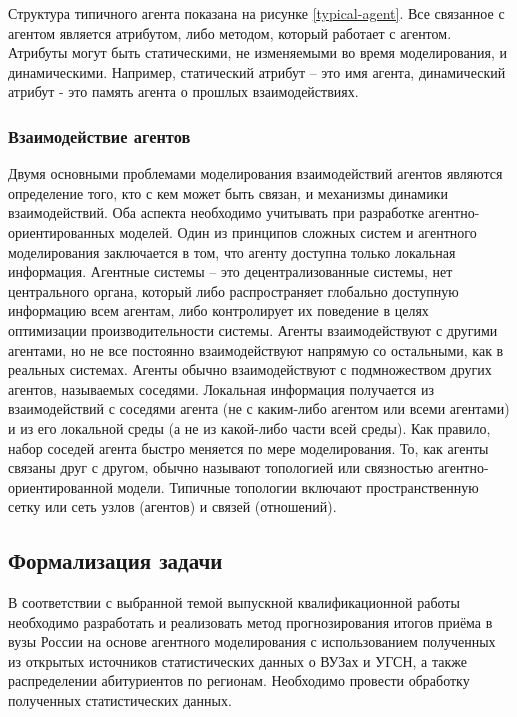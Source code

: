 Структура типичного агента показана на рисунке \ref{typical-agent}.  Все связанное с агентом является атрибутом, либо методом, который работает с агентом. Атрибуты могут быть статическими, не изменяемыми во время моделирования, и динамическими. Например, статический атрибут – это имя агента, динамический атрибут - это память агента о прошлых взаимодействиях.


\subsubsection{Взаимодействие агентов}

Двумя основными проблемами моделирования взаимодействий агентов являются определение того, кто с кем может быть связан, и механизмы динамики взаимодействий. Оба аспекта необходимо учитывать при разработке агентно-ориентированных моделей. Один из принципов сложных систем и агентного моделирования заключается в том, что агенту доступна только локальная информация. Агентные системы – это децентрализованные системы, нет центрального органа, который либо распространяет глобально доступную информацию всем агентам, либо контролирует их поведение в целях оптимизации производительности системы. Агенты взаимодействуют с другими агентами, но не все постоянно взаимодействуют напрямую со остальными, как в реальных системах. Агенты обычно взаимодействуют с подмножеством других агентов, называемых соседями. Локальная информация получается из взаимодействий с соседями агента (не с каким-либо агентом или всеми агентами) и из его локальной среды (а не из какой-либо части всей среды). Как правило, набор соседей агента быстро меняется по мере моделирования. То, как агенты связаны друг с другом, обычно называют топологией или связностью агентно-ориентированной модели. Типичные топологии включают пространственную сетку или сеть узлов (агентов) и связей (отношений).

\subsection{Формализация задачи}

В соответствии с выбранной темой выпускной квалификационной работы необходимо разработать и реализовать метод прогнозирования итогов
приёма в вузы России на основе агентного моделирования с использованием полученных из открытых источников статистических данных о ВУЗах и УГСН, а также распределении абитуриентов по регионам. Необходимо провести обработку полученных статистических данных.















\pagebreak